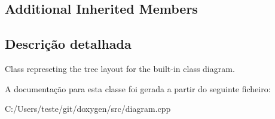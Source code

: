 \subsection*{Additional Inherited Members}


\subsection{Descrição detalhada}
Class represeting the tree layout for the built-\/in class diagram. 

A documentação para esta classe foi gerada a partir do seguinte ficheiro\-:\begin{DoxyCompactItemize}
\item 
C\-:/\-Users/teste/git/doxygen/src/diagram.\-cpp\end{DoxyCompactItemize}
